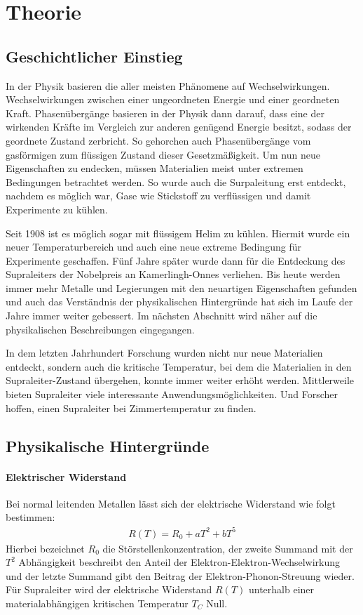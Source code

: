 \section{Theorie}
\label{sec:Theorie}
\subsection{Geschichtlicher Einstieg}
In der Physik basieren die aller meisten Ph\"anomene auf Wechselwir{\-}kun{\-}gen.
Wechselwir{\-}kun{\-}gen zwischen einer ungeordneten Energie und einer geordneten Kraft.
Phasen\"uberg\"ange basieren in der Physik dann darauf, dass eine der wirkenden Kr\"afte im Vergleich zur anderen gen\"ugend Energie besitzt, sodass der geordnete Zustand zerbricht.
So gehorchen auch Phasen\"uberg\"ange vom gasf\"ormigen zum fl\"ussigen Zustand dieser Gesetzm\"a{\ss}igkeit.
Um nun neue Eigenschaften zu endecken, m\"ussen Materialien meist unter extremen Bedingungen betrachtet werden.
So wurde auch die Surpaleitung erst entdeckt, nachdem es m\"oglich war, Gase wie Stickstoff zu verfl\"ussigen und damit Experimente zu k\"uhlen.

Seit 1908 ist es m\"oglich sogar mit fl\"ussigem Helim zu k\"uhlen.
Hiermit wurde ein neuer Temperaturbereich und auch eine neue extreme Bedingung f\"ur Experimente geschaffen.
F\"unf Jahre sp\"ater wurde dann f\"ur die Entdeckung des Supraleiters der Nobelpreis an Kamerlingh-Onnes verliehen.
Bis heute werden immer mehr Metalle und Legierungen mit den neuartigen Eigenschaften gefunden und auch das Verst\"andnis der physikalischen Hintergr\"unde hat sich im Laufe der Jahre immer weiter gebessert.
Im n\"achsten Abschnitt wird n\"aher auf die physikalischen Beschreibungen eingegangen.

In dem letzten Jahrhundert Forschung wurden nicht nur neue Materialien entdeckt, sondern auch die kritische Temperatur, bei dem die Materialien in den Supraleiter-Zustand \"ubergehen, konnte immer weiter erh\"oht werden.
Mittlerweile bieten Supraleiter viele interessante Anwendungsmöglichkeiten.
Und Forscher hoffen, einen Supraleiter bei Zimmertemperatur zu finden. 

\subsection{Physikalische Hintergr\"unde}
\paragraph{Elektrischer Widerstand}
Bei normal leitenden Metallen l\"{a}sst sich der elektrische Wider{\-}stand wie folgt bestimmen:
\begin{align*}
	R(T) = R_0 + aT^2 + bT^5
\end{align*}
Hierbei bezeichnet $R_0$ die St\"{o}rstellenkonzentration, der zweite Summand mit der $T^2$ Abh\"{a}ngigkeit beschreibt den Anteil der Elektron-Elektron-Wechselwirkung und der letzte Summand gibt den Beitrag der Elektron-Phonon-Streuung wieder. \\
F\"{u}r Supraleiter wird der elektrische Widerstand $R(T)$ unterhalb einer materialabh\"{a}ngigen kritischen Temperatur $T_C$ Null.

